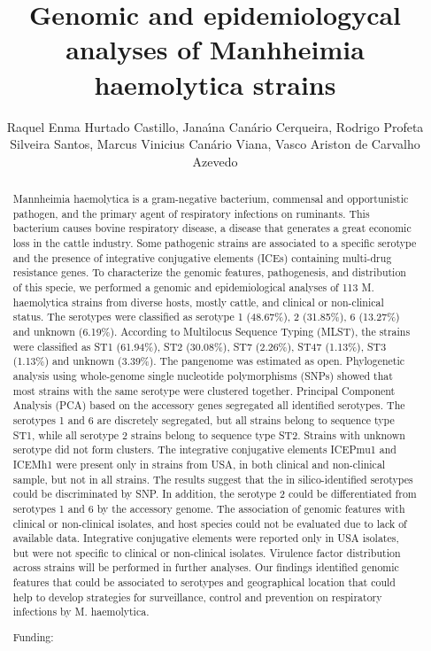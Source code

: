 \documentclass[twoside]{article}
\title{\vspace{-15mm}\fontsize{24pt}{10pt}\selectfont\textbf{ Genomic and epidemiologycal analyses of Manhheimia haemolytica strains }} %
\author{ Raquel Enma Hurtado Castillo, Jana\'{\i}na Can\'ario Cerqueira, Rodrigo Profeta Silveira Santos, Marcus Vinicius Can\'ario Viana, Vasco Ariston de Carvalho Azevedo }
\affil{ Universidade Federal de Minas Gerais }
\date{}
\begin{document}
  
  
  \maketitle %
  
  
  \thispagestyle{fancy} %
  
  
  \begin{abstract}
  Mannheimia haemolytica is a gram-negative bacterium,  commensal and opportunistic pathogen,  and the primary agent of respiratory infections on ruminants. This bacterium causes bovine respiratory disease,  a disease that generates a great economic loss in the cattle industry. Some pathogenic strains are associated to a specific serotype and the presence of integrative conjugative elements (ICEs) containing multi-drug resistance genes. To characterize the genomic features,  pathogenesis,  and distribution of this specie,  we performed a genomic and epidemiological analyses of 113 M. haemolytica strains from diverse hosts,  mostly cattle,  and clinical or non-clinical status. The serotypes were classified as serotype 1 (48.67\%),  2 (31.85\%),  6 (13.27\%) and unknown (6.19\%). According to Multilocus Sequence Typing (MLST),  the strains were classified as  ST1 (61.94\%),  ST2 (30.08\%),  ST7 (2.26\%),  ST47 (1.13\%),  ST3 (1.13\%) and unknown (3.39\%). The pangenome was estimated as open. Phylogenetic analysis using whole-genome single nucleotide polymorphisms (SNPs) showed that most strains with the same serotype were clustered together. Principal Component Analysis (PCA) based on the accessory genes segregated all identified serotypes. The serotypes 1 and 6 are discretely segregated,  but all strains belong to sequence type ST1,  while all serotype 2 strains belong to sequence type ST2. Strains with unknown serotype did not form clusters. The integrative conjugative elements ICEPmu1 and ICEMh1 were present only in strains from USA,  in both clinical and non-clinical sample,  but not in all strains. The results suggest that the in silico-identified serotypes could be discriminated by SNP. In addition,  the serotype 2 could be differentiated from serotypes 1 and 6 by the accessory genome. The association of genomic features with clinical or non-clinical isolates,  and host species could not be evaluated due to lack of available data. Integrative conjugative elements were reported only in USA isolates,  but were not specific to clinical or non-clinical isolates. Virulence factor distribution across strains will be performed in further analyses. Our findings identified genomic features that could be associated to serotypes and geographical location that could help to develop strategies for surveillance,  control and prevention on respiratory infections by M. haemolytica.
  
  Funding:  \\ 
  \end{abstract}
  
\end{document}
